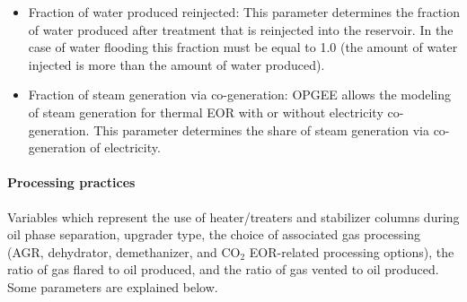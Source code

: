 \documentclass[11pt]{report}
\newcommand{\marg}[1]{{\footnotesize\textit{\textcolor{stanford}{'#1'}}}}
\newcommand{\marginnote}[1]{\marginpar{\marg{#1}}}
\begin{document}
\begin{itemize}
\item Fraction of water produced reinjected: This parameter determines the fraction of water produced after treatment that is reinjected into the reservoir. In the case of water flooding this fraction must be equal to 1.0 (the amount of water injected is more than the amount of water produced).
\item Fraction of steam generation via co-generation: OPGEE allows the modeling of steam generation for thermal EOR with or without electricity co-generation. This parameter determines the share of steam generation via co-generation of electricity. 

\end{itemize}


\paragraph{Processing practices} Variables which represent \marginnote{Inputs 1.5} the use of heater/treaters and stabilizer columns during oil phase separation, upgrader type, the choice of associated gas processing (AGR, dehydrator, demethanizer, and CO$_2$ EOR-related processing options), the ratio of gas flared to oil produced, and the ratio of gas vented to oil produced. Some parameters are explained below.
\end{document}
